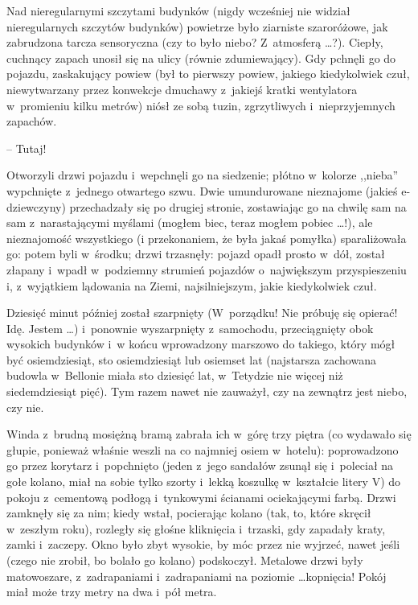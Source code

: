 \documentclass[oneside,polish,11pt,rmheadings]{mwbk}
\begin{document}
Nad nieregularnymi szczytami budynków (nigdy wcześniej nie widział nieregularnych szczytów budynków) powietrze było ziarniste szaroróżowe, jak zabrudzona tarcza sensoryczna (czy to było niebo? Z~atmosferą \ldots ?). Ciepły, cuchnący zapach unosił się na ulicy (równie zdumiewający). Gdy pchnęli go do pojazdu, zaskakujący powiew (był to pierwszy powiew, jakiego kiedykolwiek czuł, niewytwarzany przez konwekcje dmuchawy z~jakiejś kratki wentylatora w~promieniu kilku metrów) niósł ze sobą tuzin, zgrzytliwych i~nieprzyjemnych zapachów. 

-- Tutaj! 

Otworzyli drzwi pojazdu i~wepchnęli go na siedzenie; płótno w~kolorze ,,nieba'' wypchnięte z~jednego otwartego szwu. Dwie umundurowane nieznajome (jakieś e-dziewczyny) przechadzały się po drugiej stronie, zostawiając go na chwilę sam na sam z~narastającymi myślami (mogłem biec, teraz mogłem pobiec  \ldots !), ale nieznajomość wszystkiego (i przekonaniem, że była jakaś pomyłka) sparaliżowała go: potem byli w~środku; drzwi trzasnęły: pojazd opadł prosto w~dół, został złapany i~wpadł w~podziemny strumień pojazdów o~największym przyspieszeniu i, z~wyjątkiem lądowania na Ziemi, najsilniejszym, jakie kiedykolwiek czuł. 

Dziesięć minut później został szarpnięty (W~porządku! Nie próbuję się opierać! Idę. Jestem \ldots ) i~ponownie wyszarpnięty z~samochodu, przeciągnięty obok wysokich budynków i~w końcu wprowadzony marszowo do takiego, który mógł być osiemdziesiąt, sto osiemdziesiąt lub osiemset lat (najstarsza zachowana budowla w~Bellonie miała sto dziesięć lat, w~Tetydzie nie więcej niż siedemdziesiąt pięć). Tym razem nawet nie zauważył, czy na zewnątrz jest niebo, czy nie. 

Winda z~brudną mosiężną bramą zabrała ich w~górę trzy piętra (co wydawało się głupie, ponieważ właśnie weszli na co najmniej osiem w~hotelu): poprowadzono go przez korytarz i~popchnięto (jeden z~jego sandałów zsunął się i~poleciał na gołe kolano, miał na sobie tylko szorty i~lekką koszulkę w~kształcie litery V) do pokoju z~cementową podłogą i~tynkowymi ścianami ociekającymi farbą. Drzwi zamknęły się za nim; kiedy wstał, pocierając kolano (tak, to, które skręcił w~zeszłym roku), rozległy się głośne kliknięcia i~trzaski, gdy zapadały kraty, zamki i~zaczepy. Okno było zbyt wysokie, by móc przez nie wyjrzeć, nawet jeśli (czego nie zrobił, bo bolało go kolano) podskoczył. Metalowe drzwi były matowoszare, z~zadrapaniami i~zadrapaniami na poziomie \ldots  kopnięcia! Pokój miał może trzy metry na dwa i~pół metra. 
\end{document}
